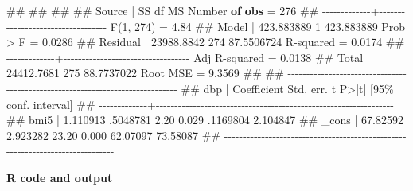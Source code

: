 \documentclass[
  letterpaper,
  DIV=11,
  numbers=noendperiod]{scrreprt}
\newenvironment{Shaded}{\begin{snugshade}}{\end{snugshade}}
\newcommand{\DataTypeTok}[1]{\textcolor[rgb]{0.68,0.00,0.00}{#1}}
\newcommand{\FunctionTok}[1]{\textcolor[rgb]{0.28,0.35,0.67}{#1}}
\newcommand{\KeywordTok}[1]{\textcolor[rgb]{0.00,0.23,0.31}{\textbf{#1}}}
\newcommand{\NormalTok}[1]{\textcolor[rgb]{0.00,0.23,0.31}{#1}}
\begin{document}
\begin{Shaded}
\begin{Highlighting}[]
\NormalTok{\#\# }
\NormalTok{\#\# }
\NormalTok{\#\# }
\NormalTok{\#\#       Source |       SS           df       MS      Number }\KeywordTok{of} \KeywordTok{obs}\NormalTok{   =       276}
\NormalTok{\#\# {-}{-}{-}{-}{-}{-}{-}{-}{-}{-}{-}{-}{-}+{-}{-}{-}{-}{-}{-}{-}{-}{-}{-}{-}{-}{-}{-}{-}{-}{-}{-}{-}{-}{-}{-}{-}{-}{-}{-}{-}{-}{-}{-}{-}{-}{-}{-}   }\FunctionTok{F}\NormalTok{(1, 274)       =      4.84}
\NormalTok{\#\#        Model |  423.883889         1  423.883889   Prob \textgreater{} }\FunctionTok{F}\NormalTok{        =    0.0286}
\NormalTok{\#\#     Residual |  23988.8842       274  87.5506724   R{-}squared       =    0.0174}
\NormalTok{\#\# {-}{-}{-}{-}{-}{-}{-}{-}{-}{-}{-}{-}{-}+{-}{-}{-}{-}{-}{-}{-}{-}{-}{-}{-}{-}{-}{-}{-}{-}{-}{-}{-}{-}{-}{-}{-}{-}{-}{-}{-}{-}{-}{-}{-}{-}{-}{-}   Adj R{-}squared   =    0.0138}
\NormalTok{\#\#        Total |  24412.7681       275  88.7737022   Root MSE        =    9.3569}
\NormalTok{\#\# }
\NormalTok{\#\# {-}{-}{-}{-}{-}{-}{-}{-}{-}{-}{-}{-}{-}{-}{-}{-}{-}{-}{-}{-}{-}{-}{-}{-}{-}{-}{-}{-}{-}{-}{-}{-}{-}{-}{-}{-}{-}{-}{-}{-}{-}{-}{-}{-}{-}{-}{-}{-}{-}{-}{-}{-}{-}{-}{-}{-}{-}{-}{-}{-}{-}{-}{-}{-}{-}{-}{-}{-}{-}{-}{-}{-}{-}{-}{-}{-}{-}{-}}
\NormalTok{\#\#          dbp | Coefficient  Std. err.      t    P\textgreater{}|t|     [95\% conf. interval]}
\NormalTok{\#\# {-}{-}{-}{-}{-}{-}{-}{-}{-}{-}{-}{-}{-}+{-}{-}{-}{-}{-}{-}{-}{-}{-}{-}{-}{-}{-}{-}{-}{-}{-}{-}{-}{-}{-}{-}{-}{-}{-}{-}{-}{-}{-}{-}{-}{-}{-}{-}{-}{-}{-}{-}{-}{-}{-}{-}{-}{-}{-}{-}{-}{-}{-}{-}{-}{-}{-}{-}{-}{-}{-}{-}{-}{-}{-}{-}{-}{-}}
\NormalTok{\#\#         bmi5 |   1.110913   .5048781     2.20   0.029     .1169804    2.104847}
\NormalTok{\#\#        }\DataTypeTok{\_cons}\NormalTok{ |   67.82592   2.923282    23.20   0.000     62.07097    73.58087}
\NormalTok{\#\# {-}{-}{-}{-}{-}{-}{-}{-}{-}{-}{-}{-}{-}{-}{-}{-}{-}{-}{-}{-}{-}{-}{-}{-}{-}{-}{-}{-}{-}{-}{-}{-}{-}{-}{-}{-}{-}{-}{-}{-}{-}{-}{-}{-}{-}{-}{-}{-}{-}{-}{-}{-}{-}{-}{-}{-}{-}{-}{-}{-}{-}{-}{-}{-}{-}{-}{-}{-}{-}{-}{-}{-}{-}{-}{-}{-}{-}{-}}
\end{Highlighting}
\end{Shaded}

\textbf{R code and output}
\end{document}
